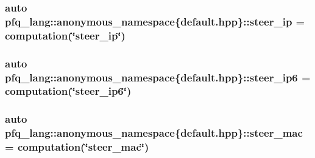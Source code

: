 \hypertarget{namespacepfq__lang_1_1anonymous__namespace_02default_8hpp_03_ab44cbea49db522460c5bce82d04280cd}{
\subsubsection[{steer\-\_\-ip}]{\setlength{\rightskip}{0pt plus 5cm}auto pfq\-\_\-lang\-::anonymous\-\_\-namespace\{default.\-hpp\}\-::steer\-\_\-ip = {\bf computation}(\char`\"{}steer\-\_\-ip\char`\"{})}}\label{namespacepfq__lang_1_1anonymous__namespace_02default_8hpp_03_ab44cbea49db522460c5bce82d04280cd}
\hypertarget{namespacepfq__lang_1_1anonymous__namespace_02default_8hpp_03_a011de504f63578469615a302f823d238}{
\subsubsection[{steer\-\_\-ip6}]{\setlength{\rightskip}{0pt plus 5cm}auto pfq\-\_\-lang\-::anonymous\-\_\-namespace\{default.\-hpp\}\-::steer\-\_\-ip6 = {\bf computation}(\char`\"{}steer\-\_\-ip6\char`\"{})}}\label{namespacepfq__lang_1_1anonymous__namespace_02default_8hpp_03_a011de504f63578469615a302f823d238}
\hypertarget{namespacepfq__lang_1_1anonymous__namespace_02default_8hpp_03_ae7da9a6b9dc131b2c6c5c3044067eddf}{
\subsubsection[{steer\-\_\-mac}]{\setlength{\rightskip}{0pt plus 5cm}auto pfq\-\_\-lang\-::anonymous\-\_\-namespace\{default.\-hpp\}\-::steer\-\_\-mac = {\bf computation}(\char`\"{}steer\-\_\-mac\char`\"{})}}\label{namespacepfq__lang_1_1anonymous__namespace_02default_8hpp_03_ae7da9a6b9dc131b2c6c5c3044067eddf}

